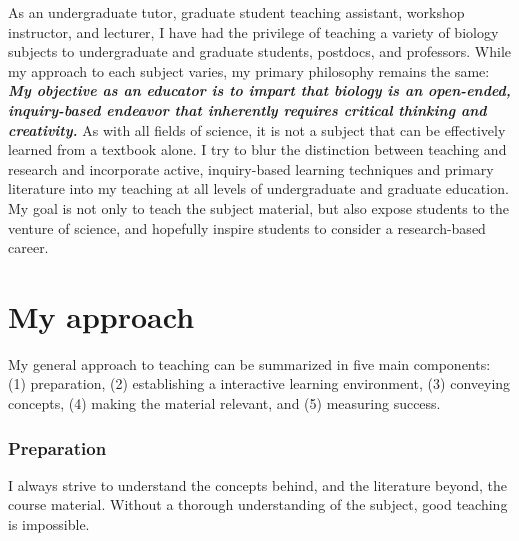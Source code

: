 As an undergraduate tutor, graduate student teaching assistant, workshop
instructor, and lecturer,
I have had the privilege of teaching a variety of biology subjects to
undergraduate and graduate students, postdocs, and professors.
While my approach to each subject varies, my primary philosophy remains the
same:
\textbf{\textit{My objective as an educator is to impart that biology is an
open-ended, inquiry-based endeavor that inherently requires critical thinking
and creativity.}}
As with all fields of science, it is not a subject that can be effectively
learned from a textbook alone.
I try to blur the distinction between teaching and research and incorporate
active, inquiry-based learning techniques and primary literature into my
teaching at all levels of undergraduate and graduate education.
My goal is not only to teach the subject material, but also expose students to
the venture of science, and hopefully inspire students to consider a
research-based career. 

\section*{My approach}
My general approach to teaching can be summarized in five main components:
(1) preparation,
(2) establishing a interactive learning environment,
(3) conveying concepts,
(4) making the material relevant,
and
(5) measuring success.

\subsubsection*{Preparation}
I always strive to understand the concepts behind, and the literature beyond,
the course material.
Without a thorough understanding of the subject, good teaching is impossible.

